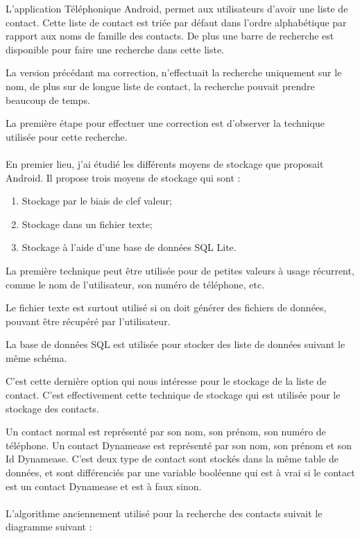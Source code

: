 L'application Téléphonique Android, permet aux utilisateurs d'avoir une liste de contact. Cette liste de contact est triée par défaut dans l'ordre alphabétique par rapport aux noms de famille des contacts. De plus une barre de recherche est disponible pour faire une recherche dans cette liste.

La version précédant ma correction, n'effectuait la recherche uniquement sur le nom, de plus sur de longue liste de contact, la recherche pouvait prendre beaucoup de temps.

La première étape pour effectuer une correction est d'observer la technique utilisée pour cette recherche.\\\\

En premier lieu, j'ai étudié les différents moyens de stockage que proposait Android. Il propose trois moyens de stockage qui sont :

\begin{enumerate}
	\item Stockage par le biais de clef valeur;
	\item Stockage dans un fichier texte;
	\item Stockage à l'aide d'une base de données SQL Lite.
\end{enumerate}

La première technique peut être utilisée pour de petites valeurs à usage récurrent, comme le nom de l'utilisateur, son numéro de téléphone, etc.

Le fichier texte est surtout utilisé si on doit générer des fichiers de données, pouvant être récupéré par l'utilisateur.

La base de données SQL est utilisée pour stocker des liste de données suivant le même schéma.

C'est cette dernière option qui nous intéresse pour le stockage de la liste de contact. C'est effectivement cette technique de stockage qui est utilisée pour le stockage des contacts.

Un contact normal est représenté par son nom, son prénom, son numéro de téléphone. Un contact Dynamease est représenté par son nom, son prénom et son Id Dynamease. C'est deux type de contact sont stockés dans la même table de données, et sont différenciés par une variable booléenne qui est à vrai si le contact est un contact Dynamease et est à faux sinon.\\\\

L'algorithme anciennement utilisé pour la recherche des contacts suivait le diagramme suivant :

